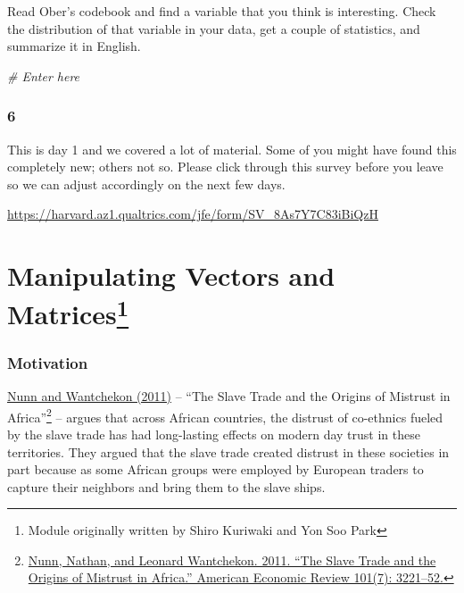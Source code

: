 \documentclass[
]{book}
\newenvironment{Shaded}{\begin{snugshade}}{\end{snugshade}}
\newcommand{\CommentTok}[1]{\textcolor[rgb]{0.56,0.35,0.01}{\textit{#1}}}
\theoremstyle{definition}
\theoremstyle{definition}
\theoremstyle{definition}
\theoremstyle{remark}
\begin{document}
Read Ober's codebook and find a variable that you think is interesting. Check the distribution of that variable in your data, get a couple of statistics, and summarize it in English.

\begin{Shaded}
\begin{Highlighting}[]
\CommentTok{\# Enter here}
\end{Highlighting}
\end{Shaded}

\hypertarget{section-5}{%
\subsection*{6}\label{section-5}}

This is day 1 and we covered a lot of material. Some of you might have found this completely new; others not so. Please click through this survey before you leave so we can adjust accordingly on the next few days.

\url{https://harvard.az1.qualtrics.com/jfe/form/SV_8As7Y7C83iBiQzH}

\hypertarget{rmatrices}{%
\chapter[Manipulating Vectors and Matrices]{\texorpdfstring{Manipulating Vectors and Matrices\footnote{Module originally written by Shiro Kuriwaki and Yon Soo Park}}{Manipulating Vectors and Matrices}}\label{rmatrices}}

\hypertarget{motivation}{%
\subsection*{Motivation}\label{motivation}}

\href{https://dash.harvard.edu/bitstream/handle/1/11986331/nunn-slave-trade.pdf}{Nunn and Wantchekon (2011)} -- ``The Slave Trade and the Origins of Mistrust in Africa''\footnote{\href{https://dash.harvard.edu/bitstream/handle/1/11986331/nunn-slave-trade.pdf}{Nunn, Nathan, and Leonard Wantchekon. 2011. ``The Slave Trade and the Origins of Mistrust in Africa.'' American Economic Review 101(7): 3221--52.}} -- argues that across African countries, the distrust of co-ethnics fueled by the slave trade has had long-lasting effects on modern day trust in these territories. They argued that the slave trade created distrust in these societies in part because as some African groups were employed by European traders to capture their neighbors and bring them to the slave ships.
\end{document}
